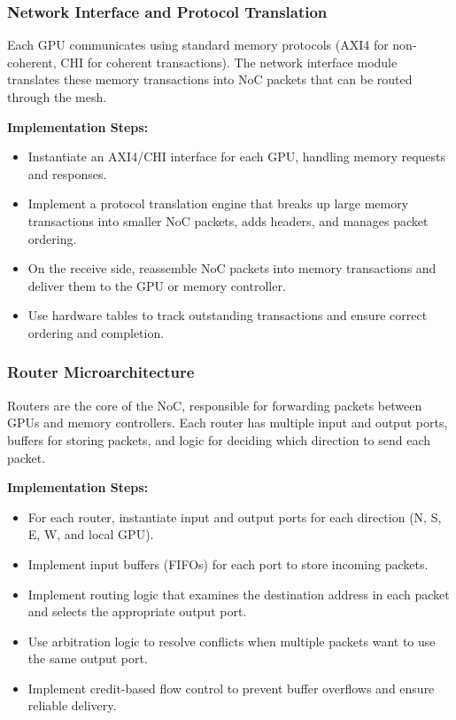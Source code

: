 \documentclass[11pt,a4paper]{article}
\begin{document}
\subsubsection{Network Interface and Protocol Translation}
Each GPU communicates using standard memory protocols (AXI4 for non-coherent, CHI for coherent transactions). The network interface module translates these memory transactions into NoC packets that can be routed through the mesh.

\textbf{Implementation Steps:}
\begin{itemize}
    \item Instantiate an AXI4/CHI interface for each GPU, handling memory requests and responses.
    \item Implement a protocol translation engine that breaks up large memory transactions into smaller NoC packets, adds headers, and manages packet ordering.
    \item On the receive side, reassemble NoC packets into memory transactions and deliver them to the GPU or memory controller.
    \item Use hardware tables to track outstanding transactions and ensure correct ordering and completion.
\end{itemize}

\subsubsection{Router Microarchitecture}
Routers are the core of the NoC, responsible for forwarding packets between GPUs and memory controllers. Each router has multiple input and output ports, buffers for storing packets, and logic for deciding which direction to send each packet.

\textbf{Implementation Steps:}
\begin{itemize}
    \item For each router, instantiate input and output ports for each direction (N, S, E, W, and local GPU).
    \item Implement input buffers (FIFOs) for each port to store incoming packets.
    \item Implement routing logic that examines the destination address in each packet and selects the appropriate output port.
    \item Use arbitration logic to resolve conflicts when multiple packets want to use the same output port.
    \item Implement credit-based flow control to prevent buffer overflows and ensure reliable delivery.
\end{itemize}
\end{document}
